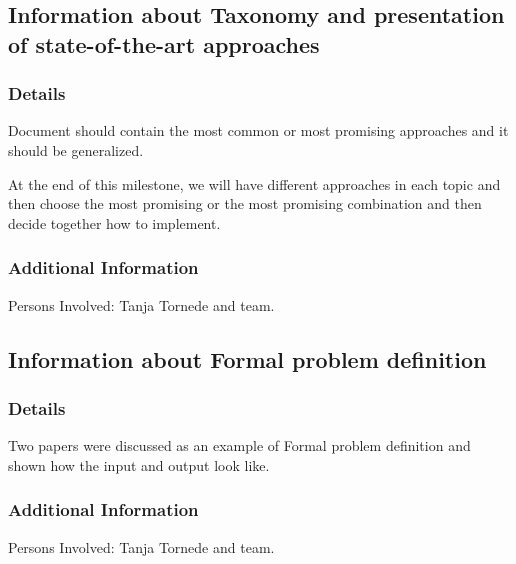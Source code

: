 \documentclass[11pt]{meetingmins} %
\begin{document}
\subsection{Information about Taxonomy and presentation of state-of-the-art approaches }
    \subsubsection{Details}
        \begin{hiddensubitems}
            \item
                Document should contain the most common or most promising approaches and it should be generalized.
            \item
                 At the end of this milestone, we will have different approaches in each topic and then choose the most promising or  the most promising combination and then decide together how to implement. 
        \end{hiddensubitems}
        
    \subsubsection{Additional Information}
        \begin{hiddensubitems}
            \item
                Persons Involved: Tanja Tornede and team.
        \end{hiddensubitems}

\subsection{Information about Formal problem definition }
    \subsubsection{Details}
        \begin{hiddensubitems}
            \item
                Two papers were discussed as an example of Formal problem definition and shown how the input and output look like.
        \end{hiddensubitems}
        
    \subsubsection{Additional Information}
        \begin{hiddensubitems}
            \item
                Persons Involved: Tanja Tornede and team.
        \end{hiddensubitems}
\end{document}
